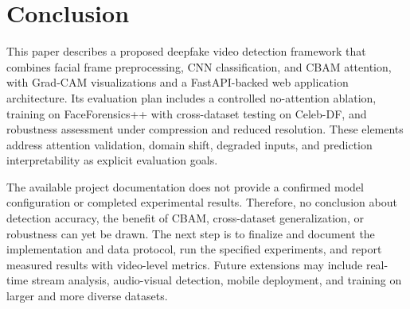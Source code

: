 \section{Conclusion}

This paper describes a proposed deepfake video detection framework that combines facial frame preprocessing, CNN classification, and CBAM attention, with Grad-CAM visualizations and a FastAPI-backed web application architecture. Its evaluation plan includes a controlled no-attention ablation, training on FaceForensics++ with cross-dataset testing on Celeb-DF, and robustness assessment under compression and reduced resolution. These elements address attention validation, domain shift, degraded inputs, and prediction interpretability as explicit evaluation goals.

The available project documentation does not provide a confirmed model configuration or completed experimental results. Therefore, no conclusion about detection accuracy, the benefit of CBAM, cross-dataset generalization, or robustness can yet be drawn. The next step is to finalize and document the implementation and data protocol, run the specified experiments, and report measured results with video-level metrics. Future extensions may include real-time stream analysis, audio-visual detection, mobile deployment, and training on larger and more diverse datasets.
